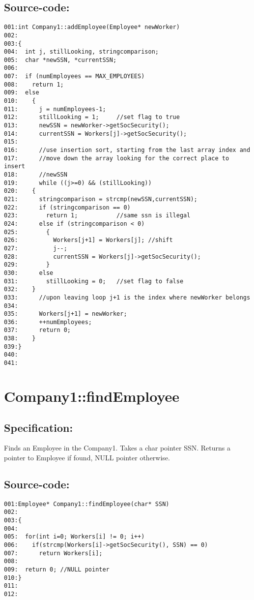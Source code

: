 \subsection*{Source-code:}
\begin{verbatim}
001:int Company1::addEmployee(Employee* newWorker) 
002:  
003:{
004:  int j, stillLooking, stringcomparison;
005:  char *newSSN, *currentSSN; 
006:  
007:  if (numEmployees == MAX_EMPLOYEES)
008:    return 1;
009:  else
010:    {
011:      j = numEmployees-1;
012:      stillLooking = 1;     //set flag to true
013:      newSSN = newWorker->getSocSecurity();
014:      currentSSN = Workers[j]->getSocSecurity();
015:
016:      //use insertion sort, starting from the last array index and
017:      //move down the array looking for the correct place to insert
018:      //newSSN
019:      while ((j>=0) && (stillLooking))
020:    {
021:      stringcomparison = strcmp(newSSN,currentSSN);
022:      if (stringcomparison == 0) 
023:        return 1;           //same ssn is illegal
024:      else if (stringcomparison < 0) 
025:        {
026:          Workers[j+1] = Workers[j]; //shift
027:          j--;  
028:          currentSSN = Workers[j]->getSocSecurity();
029:        }
030:      else
031:        stillLooking = 0;   //set flag to false
032:    }
033:      //upon leaving loop j+1 is the index where newWorker belongs
034:      
035:      Workers[j+1] = newWorker;
036:      ++numEmployees;
037:      return 0;
038:    }
039:}
040:
041:
\end{verbatim}
\section{Company1::findEmployee}
\subsection*{Specification:}
Finds an Employee in the Company1.
   Takes a char pointer SSN.
   Returns a pointer to Employee if found, NULL pointer otherwise.
\subsection*{Source-code:}
\begin{verbatim}
001:Employee* Company1::findEmployee(char* SSN)
002:    
003:{
004:    
005:  for(int i=0; Workers[i] != 0; i++)
006:    if(strcmp(Workers[i]->getSocSecurity(), SSN) == 0)
007:      return Workers[i];
008:
009:  return 0; //NULL pointer
010:}
011:
012:
\end{verbatim}
